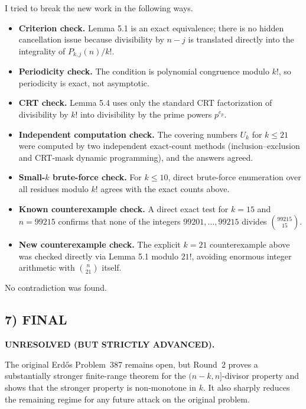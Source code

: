 I tried to break the new work in the following ways.

\begin{itemize}
\item \textbf{Criterion check.}  Lemma 5.1 is an exact equivalence; there is no hidden cancellation issue because divisibility by \(n-j\) is translated directly into the integrality of \(P_{k,j}(n)/k!\).

\item \textbf{Periodicity check.}  The condition is polynomial congruence modulo \(k!\), so periodicity is exact, not asymptotic.

\item \textbf{CRT check.}  Lemma 5.4 uses only the standard CRT factorization of divisibility by \(k!\) into divisibility by the prime powers \(p^{e_p}\).

\item \textbf{Independent computation check.}  The covering numbers \(U_k\) for \(k\le 21\) were computed by two independent exact-count methods (inclusion--exclusion and CRT-mask dynamic programming), and the answers agreed.

\item \textbf{Small-\(k\) brute-force check.}  For \(k\le 10\), direct brute-force enumeration over all residues modulo \(k!\) agrees with the exact counts above.

\item \textbf{Known counterexample check.}  A direct exact test for \(k=15\) and \(n=99215\) confirms that none of the integers \(99201,\dots,99215\) divides \(\binom{99215}{15}\).

\item \textbf{New counterexample check.}  The explicit \(k=21\) counterexample above was checked directly via Lemma 5.1 modulo \(21!\), avoiding enormous integer arithmetic with \(\binom{n}{21}\) itself.
\end{itemize}

No contradiction was found.

\subsection*{7) FINAL}

\textbf{UNRESOLVED (BUT STRICTLY ADVANCED).}

The original Erd\H{o}s Problem~387 remains open, but Round~2 proves a substantially stronger finite-range theorem for the \((n-k,n]\)-divisor property and shows that the stronger property is non-monotone in \(k\).  It also sharply reduces the remaining regime for any future attack on the original problem.

